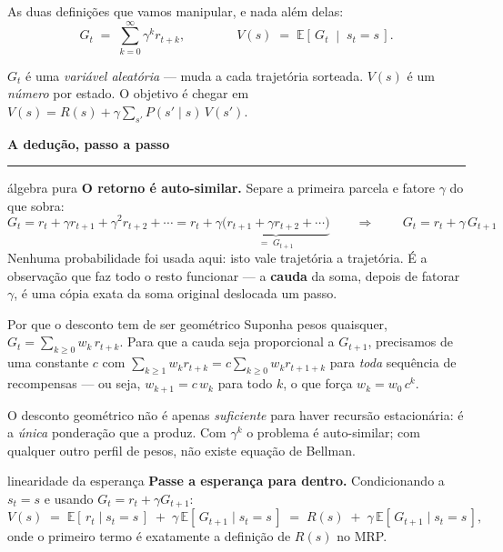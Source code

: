 \documentclass[10pt, a4paper]{article}
\newcounter{secao}
\newcommand{\secao}[1]{%
  \vspace{0.8em}%
  \stepcounter{secao}%
  \noindent{\color{rlLaranja}\rule{1.6em}{2pt}}\hspace{0.5em}%
  {\color{rlCinza}\footnotesize\bfseries\thesecao}\hspace{0.35em}%
  {\color{rlAzul}\large\bfseries #1}%
  \par\vspace{-0.15em}%
  {\color{rlAzul!22}\rule{\linewidth}{0.6pt}}%
  \par\vspace{0.3em}}
\newcounter{passo}
\newcommand{\E}{\mathbb{E}}
\newcommand{\tran}[2]{P(#1\mid #2)}
\newcommand{\rec}{R}
\begin{document}
As duas definições que vamos manipular, e nada além delas:
\[
  G_t \;=\; \sum_{k=0}^{\infty} \gamma^{k} r_{t+k},
  \qquad\qquad
  V(s) \;=\; \E\!\left[\, G_t \;\middle|\; s_t = s \,\right].
\]

$G_t$ é uma \emph{variável aleatória} — muda a cada trajetória sorteada.
$V(s)$ é um \emph{número} por estado. O objetivo é chegar em
$V(s) = \rec(s) + \gamma \sum_{s'} \tran{s'}{s}\,V(s')$.

\secao{A dedução, passo a passo}

\begin{passo}{álgebra pura}
\textbf{O retorno é auto-similar.} Separe a primeira parcela e fatore $\gamma$
do que sobra:
\[
  G_t = r_t + \gamma r_{t+1} + \gamma^2 r_{t+2} + \cdots
      = r_t + \gamma\underbrace{\bigl(r_{t+1} + \gamma r_{t+2} + \cdots\bigr)}
        _{\textstyle = \; G_{t+1}}
  \qquad\Longrightarrow\qquad
  \boxed{\,G_t = r_t + \gamma\,G_{t+1}\,}
\]
Nenhuma probabilidade foi usada aqui: isto vale trajetória a trajetória. É a
observação que faz todo o resto funcionar — a \textbf{cauda} da soma, depois de
fatorar $\gamma$, é uma cópia exata da soma original deslocada um passo.
\end{passo}

\begin{alertabox}{Por que o desconto tem de ser geométrico}
Suponha pesos quaisquer, $G_t = \sum_{k\ge0} w_k\, r_{t+k}$. Para que a cauda
seja proporcional a $G_{t+1}$, precisamos de uma constante $c$ com
$\sum_{k\ge1} w_k r_{t+k} = c\sum_{k\ge0} w_k r_{t+1+k}$ para \emph{toda}
sequência de recompensas — ou seja, $w_{k+1} = c\,w_k$ para todo $k$, o que
força $w_k = w_0\,c^{k}$.

O desconto geométrico não é apenas \emph{suficiente} para haver recursão
estacionária: é a \emph{única} ponderação que a produz. Com $\gamma^k$ o
problema é auto-similar; com qualquer outro perfil de pesos, não existe equação
de Bellman.
\end{alertabox}

\begin{passo}{linearidade da esperança}
\textbf{Passe a esperança para dentro.} Condicionando a $s_t = s$ e usando
$G_t = r_t + \gamma G_{t+1}$:
\[
  V(s) \;=\; \E[\,r_t \mid s_t = s\,]
        \;+\; \gamma\,\E[\,G_{t+1} \mid s_t = s\,]
        \;=\; \rec(s) \;+\; \gamma\,\E[\,G_{t+1} \mid s_t = s\,],
\]
onde o primeiro termo é exatamente a definição de $\rec(s)$ no MRP.

\end{passo}
\end{document}
